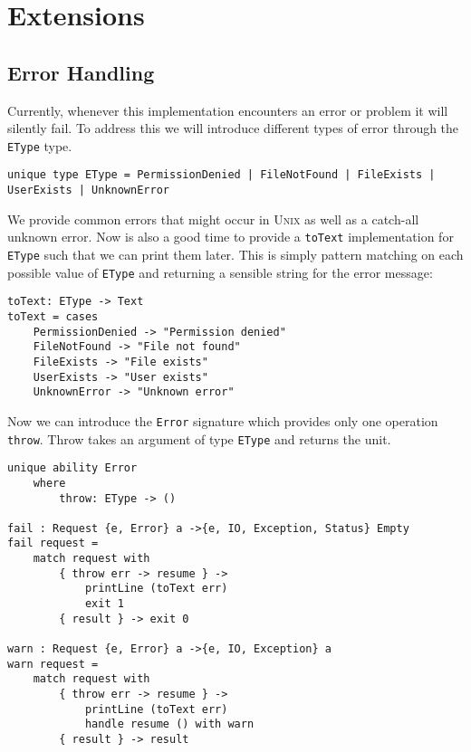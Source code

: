 \documentclass[logo,bsc,singlespacing,parskip]{infthesis}
\begin{document}
\chapter{Extensions}
\label{extensions}

\section{Error Handling}

Currently, whenever this implementation encounters an error or problem it will
silently fail. To address this we will introduce different types of error
through the \texttt{EType} type.

\begin{lstlisting}[language=unison]
unique type EType = PermissionDenied | FileNotFound | FileExists | UserExists | UnknownError
\end{lstlisting}

We provide common errors that might occur in \textsc{Unix} as well as a
catch-all unknown error. Now is also a good time to provide a \texttt{toText}
implementation for \texttt{EType} such that we can print them later. This is 
simply pattern matching on each possible value of \texttt{EType} and returning a sensible string for the error message:

\begin{lstlisting}[language=unison]
toText: EType -> Text
toText = cases  
    PermissionDenied -> "Permission denied"
    FileNotFound -> "File not found"
    FileExists -> "File exists"
    UserExists -> "User exists"
    UnknownError -> "Unknown error"
\end{lstlisting}

Now we can introduce the \texttt{Error} signature which provides only one
operation \texttt{throw}. Throw takes an argument of type \texttt{EType} and
returns the unit.

\begin{lstlisting}[language=unison]
unique ability Error
    where
        throw: EType -> ()

fail : Request {e, Error} a ->{e, IO, Exception, Status} Empty
fail request =
    match request with
        { throw err -> resume } -> 
            printLine (toText err)
            exit 1
        { result } -> exit 0

warn : Request {e, Error} a ->{e, IO, Exception} a
warn request =
    match request with
        { throw err -> resume } -> 
            printLine (toText err)
            handle resume () with warn
        { result } -> result
\end{lstlisting}
\end{document}
